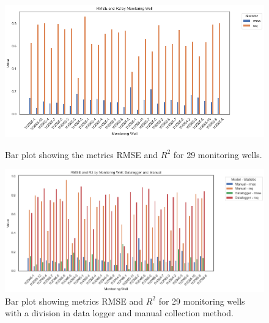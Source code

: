 \begin{figure}[h]
    \centering
    \begin{minipage}{0.48\textwidth}
        \centering
        \includegraphics[width=\linewidth]{frontmatter/Rozenburg-fig/rmser2roz.png} %
        \caption{Bar plot showing the metrics RMSE and $R^2$ for 29 monitoring wells.}
        \label{bar1}
    \end{minipage}\hfill
    \begin{minipage}{0.50\textwidth}
        \centering
        \includegraphics[width=\linewidth]{frontmatter/Rozenburg-fig/rmser2roz2.png} %
        \caption{Bar plot showing metrics RMSE and $R^2$ for 29 monitoring wells with a division in data logger and manual collection method.}
        \label{bar2}
    \end{minipage}
\end{figure}

